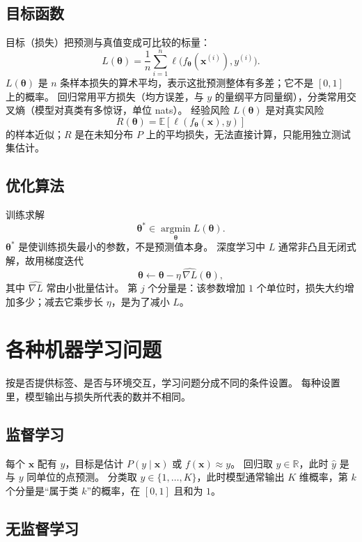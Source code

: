 \subsection{目标函数}

目标（损失）把预测与真值变成可比较的标量：
\[
L(\bm{\theta})
=
\frac{1}{n}\sum_{i=1}^{n}
\ell\bigl(f_{\bm{\theta}}(\bm{x}^{(i)}),y^{(i)}\bigr).
\]
$L(\bm{\theta})$ 是 $n$ 条样本损失的算术平均，表示这批预测整体有多差；它不是 $[0,1]$ 上的概率。
回归常用平方损失（均方误差，与 $y$ 的量纲平方同量纲），分类常用交叉熵（模型对真类有多惊讶，单位 nats）。
经验风险 $L(\bm{\theta})$ 是对真实风险
\[
R(\bm{\theta})=\mathbb{E}[\ell(f_{\bm{\theta}}(\bm{x}),y)]
\]
的样本近似；$R$ 是在未知分布 $P$ 上的平均损失，无法直接计算，只能用独立测试集估计。

\subsection{优化算法}

训练求解
\[
\bm{\theta}^{\ast}
\in
\operatorname*{argmin}_{\bm{\theta}} L(\bm{\theta}).
\]
$\bm{\theta}^{\ast}$ 是使训练损失最小的参数，不是预测值本身。
深度学习中 $L$ 通常非凸且无闭式解，故用梯度迭代
\[
\bm{\theta}
\leftarrow
\bm{\theta}-\eta\,\widehat{\nabla L}(\bm{\theta}),
\]
其中 $\widehat{\nabla L}$ 常由小批量估计。
第 $j$ 个分量是：该参数增加 $1$ 个单位时，损失大约增加多少；减去它乘步长 $\eta$，是为了减小 $L$。

\section{各种机器学习问题}

按是否提供标签、是否与环境交互，学习问题分成不同的条件设置。
每种设置里，模型输出与损失所代表的数并不相同。

\subsection{监督学习}

每个 $\bm{x}$ 配有 $y$，目标是估计 $P(y\mid\bm{x})$ 或 $f(\bm{x})\approx y$。
回归取 $y\in\mathbb{R}$，此时 $\hat{y}$ 是与 $y$ 同单位的点预测。
分类取 $y\in\{1,\ldots,K\}$，此时模型通常输出 $K$ 维概率，第 $k$ 个分量是“属于类 $k$”的概率，在 $[0,1]$ 且和为 $1$。

\subsection{无监督学习}

